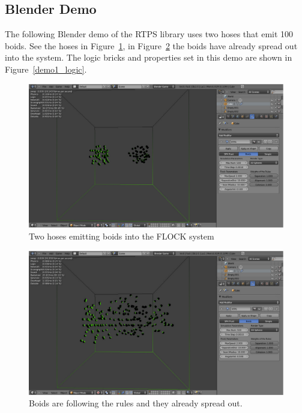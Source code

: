 \subsection{Blender Demo}

The following Blender demo of the RTPS library uses two hoses that emit 100 boids. See the hoses in Figure~\ref{demo1_1}, in Figure~\ref{demo1_2} the boids have already spread out into the system. The logic bricks and properties set in this demo are shown in Figure~\ref{demo1_logic}.

\begin{figure}[htbp]
\begin{center}
\includegraphics[scale=0.32]{figures/demo1_1.pdf}
\caption{Two hoses emitting boids into the FLOCK system}
\label{demo1_1}
\end{center}
\end{figure}

\begin{figure}[htbp]
\begin{center}
\includegraphics[scale=0.32]{figures/demo1_2.pdf}
\caption{Boids are following the rules and they already spread out.}
\label{demo1_2}
\end{center}
\end{figure}

